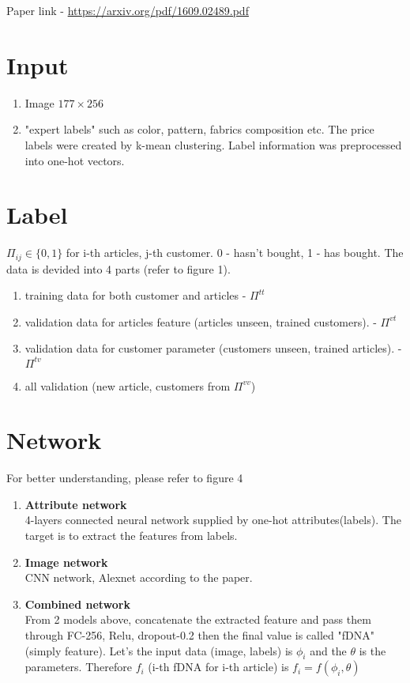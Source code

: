\documentclass{article}
\begin{document}
Paper link - \url{https://arxiv.org/pdf/1609.02489.pdf}
\section*{Input}
\begin{enumerate}
\item Image $177\times256$
\item "expert labels" such as color, pattern, fabrics composition etc. The price labels were created by k-mean clustering. Label information was preprocessed into one-hot vectors.
\end{enumerate}
\section*{Label}
$\Pi_{ij} \in \{0,1\}$ for i-th articles, j-th customer. 0 - hasn't bought, 1 - has bought. The data is devided into 4 parts (refer to figure 1).
\begin{enumerate}
\item training data for both customer and articles - $\Pi^{tt}$
\item validation data for articles feature (articles unseen, trained customers). - $\Pi^{vt}$
\item validation data for customer parameter (customers unseen, trained articles). - $\Pi^{tv}$
\item all validation (new article, customers from $\Pi^{vv}$)
\end{enumerate}
\section*{Network}
For better understanding, please refer to figure 4\\
\begin{enumerate}
\item {\bf Attribute network}\\
4-layers connected neural network supplied by one-hot attributes(labels). The target is to extract the features from labels.
\item {\bf Image network}\\
CNN network, Alexnet according to the paper.
\item {\bf Combined network}\\
From 2 models above, concatenate the extracted feature and pass them through FC-256, Relu, dropout-0.2 then the final value is called "fDNA" (simply feature). Let's the input data (image, labels) is $\phi_i$ and the $\theta$ is the parameters. Therefore $f_i$ (i-th fDNA for i-th article) is $f_i=f(\phi_i, \theta)$
\end{enumerate}
\end{document}
